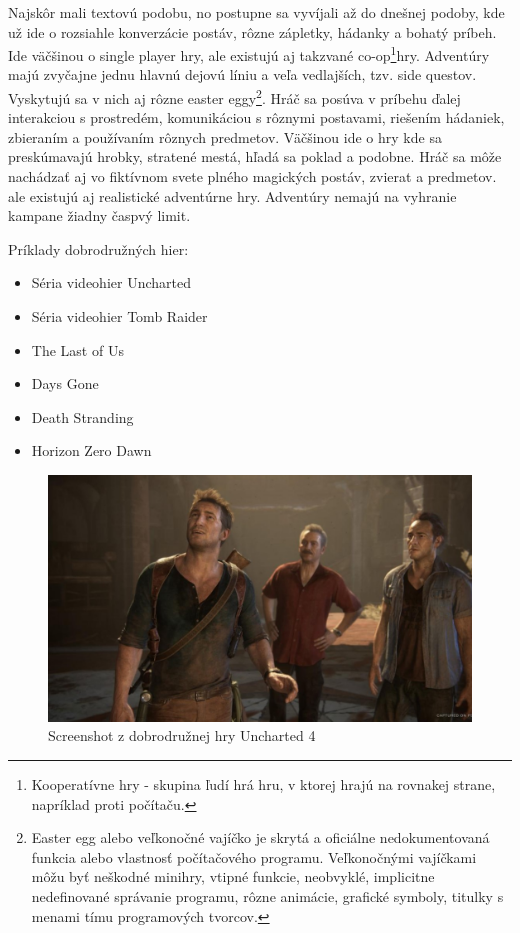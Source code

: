 \documentclass[10pt,twoside,slovak,a4paper]{article}
\begin{document}
Najskôr mali textovú podobu, no postupne sa vyvíjali až do dnešnej podoby, kde už ide o rozsiahle konverzácie postáv, rôzne zápletky, hádanky a bohatý príbeh. Ide väčšinou o single player hry, ale existujú aj takzvané co-op\footnote{Kooperatívne hry - skupina ľudí hrá hru, v ktorej hrajú na rovnakej strane, napríklad proti počítaču.}hry. Adventúry majú zvyčajne jednu hlavnú dejovú líniu a veľa vedlajších, tzv. side questov. Vyskytujú sa v nich aj rôzne easter eggy\footnote{Easter egg alebo veľkonočné vajíčko je skrytá a oficiálne nedokumentovaná funkcia alebo vlastnosť počítačového programu. Veľkonočnými vajíčkami môžu byť neškodné minihry, vtipné funkcie, neobvyklé, implicitne nedefinované správanie programu, rôzne animácie, grafické symboly, titulky s menami tímu programových tvorcov.}. Hráč sa posúva v príbehu ďalej interakciou s prostredém, komunikáciou s rôznymi postavami, riešením hádaniek, zbieraním a používaním rôznych predmetov. Väčšinou ide o hry kde sa preskúmavajú hrobky, stratené mestá, hľadá sa poklad a podobne. Hráč sa môže nachádzať aj vo fiktívnom svete plného magických postáv, zvierat a predmetov. ale existujú aj realistické adventúrne hry. Adventúry nemajú na vyhranie kampane žiadny časpvý limit.

Príklady dobrodružných hier:
\begin{itemize}
\item Séria videohier Uncharted
\item Séria videohier Tomb Raider
\item The Last of Us
\item Days Gone
\item Death Stranding
\item Horizon Zero Dawn
\end{itemize}

\begin{figure}[tbh]
\centering
\includegraphics[scale=0.3]{Screenshot.jpg}
\caption{Screenshot z dobrodružnej hry Uncharted 4}
\label{f:uncharted}
\end{figure}
\end{document}

